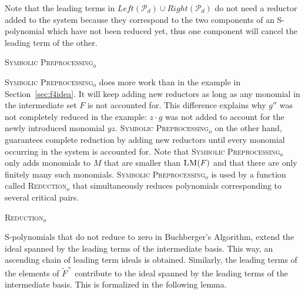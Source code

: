 Note that the leading terms in $Left(\mathcal{P}_d) \cup Right(\mathcal{P}_d)$ do not need a reductor added to the system because they correspond to the two
components of an S-polynomial which have not been reduced yet, thus one component will cancel the leading term of the other.

\begin{algorithm}[ht]

\caption{\textsc{Symbolic Preprocessing$_o$}} 
\label{alg:symbolic_preprocessingo}
\end{algorithm}

\textsc{Symbolic Preprocessing$_o$} does more work than in the example in Section~\ref{sec:f4idea}. It will keep adding new reductors as long as any
monomial in the intermediate set $F$ is not accounted for. This difference explains why $g''$ was not completely reduced in the example:  $z \cdot g$ was not added to account for the newly introduced monomial $yz$. \textsc{Symbolic Preprocessing$_o$} on the other hand, guarantees complete reduction by adding new reductors until every monomial occurring in the system is accounted for. Note that \textsc{Symbolic Preprocessing$_o$} only adds monomials to $M$ that are smaller
than $\textsc{LM}(F)$ and that there are only finitely many such monomials. \textsc{Symbolic Preprocessing$_o$} is used by a function called \textsc{Reduction$_o$} that
simultaneously reduces polynomials corresponding to several critical pairs.

\begin{algorithm}[ht]

\caption{\textsc{Reduction}$_o$} 
\label{alg:reductiono}
\end{algorithm}

S-polynomials that do not reduce to zero in Buchberger's Algorithm, extend the ideal spanned by the leading terms of the intermediate basis. This way, an ascending chain of leading term ideals is obtained. Similarly, the leading terms of the elements of $\tilde{F}^+$ contribute to the ideal spanned by the leading
terms of the intermediate basis. This is formalized in the following lemma.

